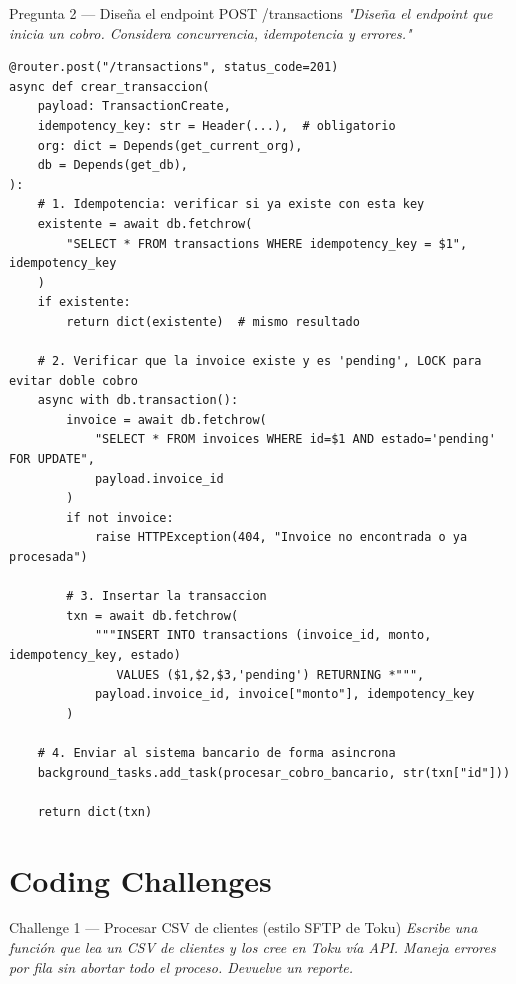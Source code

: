 \documentclass[11pt,a4paper]{article}
\begin{document}
\begin{preguntabox}{Pregunta 2 — Diseña el endpoint POST /transactions}
\textit{"Diseña el endpoint que inicia un cobro. Considera concurrencia, idempotencia y errores."}
\end{preguntabox}

\begin{respuestabox}
\begin{lstlisting}[style=python,numbers=none]
@router.post("/transactions", status_code=201)
async def crear_transaccion(
    payload: TransactionCreate,
    idempotency_key: str = Header(...),  # obligatorio
    org: dict = Depends(get_current_org),
    db = Depends(get_db),
):
    # 1. Idempotencia: verificar si ya existe con esta key
    existente = await db.fetchrow(
        "SELECT * FROM transactions WHERE idempotency_key = $1", idempotency_key
    )
    if existente:
        return dict(existente)  # mismo resultado

    # 2. Verificar que la invoice existe y es 'pending', LOCK para evitar doble cobro
    async with db.transaction():
        invoice = await db.fetchrow(
            "SELECT * FROM invoices WHERE id=$1 AND estado='pending' FOR UPDATE",
            payload.invoice_id
        )
        if not invoice:
            raise HTTPException(404, "Invoice no encontrada o ya procesada")

        # 3. Insertar la transaccion
        txn = await db.fetchrow(
            """INSERT INTO transactions (invoice_id, monto, idempotency_key, estado)
               VALUES ($1,$2,$3,'pending') RETURNING *""",
            payload.invoice_id, invoice["monto"], idempotency_key
        )

    # 4. Enviar al sistema bancario de forma asincrona
    background_tasks.add_task(procesar_cobro_bancario, str(txn["id"]))

    return dict(txn)
\end{lstlisting}
\end{respuestabox}

\section{Coding Challenges}

\begin{preguntabox}{Challenge 1 — Procesar CSV de clientes (estilo SFTP de Toku)}
\textit{Escribe una función que lea un CSV de clientes y los cree en Toku vía API.
Maneja errores por fila sin abortar todo el proceso. Devuelve un reporte.}
\end{preguntabox}
\end{document}
